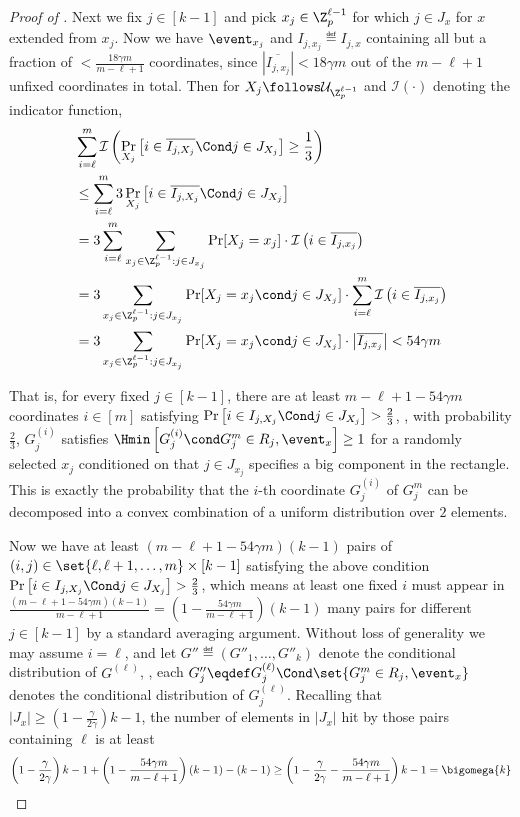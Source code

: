 \begin{proof}[Proof of ]
		Next we fix $j\in [k-1]$ and pick $x_j\in\Z_p^{\ell-1}$ for which $j\in J_{x}$ for $x$ extended from $x_j$.
		Now we have $\event_{x_j}$ and $I_{j,x_j} \eqdef I_{j,x}$ containing all but a fraction of $<\frac{18\gamma m}{m-\ell+1}$ coordinates, since $\left|\overline{I_{j,x_j}}\right|< 18\gamma m$ out of the $m-\ell+1$ unfixed coordinates in total.
		Then for $X_j\follows \mathcal{U}_{\Z_p^{\ell-1}}$ and $\mathcal{I}(\cdot)$ denoting the indicator function, 
		\begin{align*}
			& \sum_{i=\ell}^m \mathcal{I}\left( \Pr_{X_j}\left[ i\in \overline{I_{j,X_j}} \Cond j\in J_{X_j} \right] \ge \frac{1}{3}\right)\\
			&\le \sum_{i=\ell}^m 3 \Pr_{X_j} \left[ i\in \overline{I_{j,X_j}} \Cond j\in J_{X_j} \right] \\
			&= 3\sum_{i=\ell}^m \sum_{x_j\in \Z_p^{\ell-1}: j\in J_{x_j}} \Pr[X_j={x_j}] \cdot \mathcal{I}\left(  i\in \overline{I_{j,x_j}} \right)\\
			&= 3 \sum_{x_j\in \Z_p^{\ell-1}: j\in J_{x_j}} \Pr[X_j={x_j}\cond j\in J_{X_j}] \cdot \sum_{i=\ell}^m  \mathcal{I}\left(  i\in \overline{I_{j,x_j}} \right)\\
			&=  3 \sum_{x_j\in \Z_p^{\ell-1}: j\in J_{x_j}} \Pr[X_j={x_j}\cond j\in J_{X_j}] \cdot \left| \overline{I_{j,x_j}} \right|
			< 54 \gamma m
		\end{align*}

		That is, for every fixed  $j\in [k-1]$, there are at least $m-\ell+1-54\gamma m$ coordinates $i\in [m]$ satisfying $\Pr \left[ i\in I_{j,X_j} \Cond j\in J_{X_j} \right] > \frac{2}{3}$,
		\ie, with probability $\frac{2}{3}$, $G_j^{(i)}$ satisfies $\Hmin\left[ G_j^{(i)}\cond G_j^m\in R_j,\event_x  \right]\ge 1$ for a randomly selected $x_j$ conditioned on that $j\in J_{x_j}$ specifies a big component in the rectangle.
		This is exactly the probability that the $i$-th coordinate $G_j^{(i)} $ of $G_j^m$ can be decomposed into a convex combination of a uniform distribution over $2$ elements.

		Now we have at least $(m-\ell+1-54\gamma m)(k-1)$ pairs of $(i,j)\in \set{\ell,\ell+1,\dots,m}\times[k-1]$ satisfying the above condition $\Pr \left[ i\in I_{j,X_j} \Cond j\in J_{X_j} \right] > \frac{2}{3}$, 
		which means at least one fixed $i$ must appear in 
		$\frac {(m-\ell+1-54\gamma m)(k-1)}{m-\ell+1} = \left(1- \frac {54\gamma m}{m-\ell+1}\right)(k-1)$ many pairs for different $j\in[k-1]$ by a standard averaging argument.
		Without loss of generality we may assume $i=\ell$, and let $G''\eqdef(G''_1,\dots,G''_k)$ denote the conditional distribution of $G^{(\ell)}$, \ie, each $G_j''\eqdef G_j^{(\ell)}\Cond\set{G_j^m\in R_j,\event_x}$ denotes the conditional distribution of $G_j^{(\ell)}$. 
		Recalling that $|J_x|\ge \left(1-\frac{\gamma}{2\gamma}\right)k-1$, 
		the number of elements in $|J_x|$ hit by those pairs containing $\ell$ is at least
		$$\left(1-\frac{\gamma}{2\gamma}\right)k-1 +  \left(1- \frac {54\gamma m}{m-\ell+1}\right)(k-1) - (k-1) \ge  \left(1-\frac{\gamma}{2\gamma}- \frac {54\gamma m}{m-\ell+1}\right)k-1=\bigomega{k}$$ 


\end{proof}
